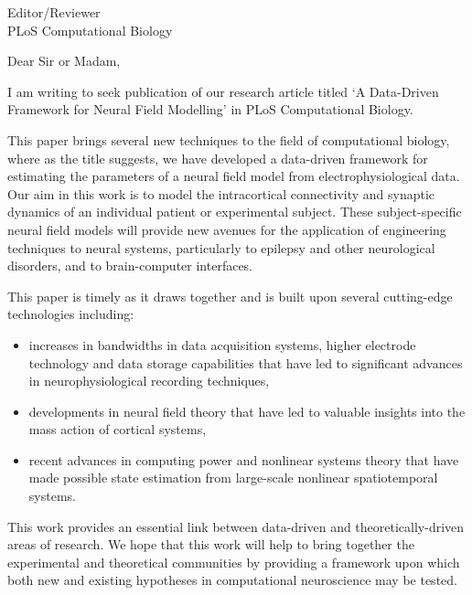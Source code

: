 \documentclass[a4paper,10pt]{letter}
\begin{document}
\vspace{-1cm}
\begin{letter}{Editor/Reviewer \\ PLoS Computational Biology}

\opening{Dear Sir or Madam,}




I am writing to seek publication of our research article titled `A Data-Driven Framework for Neural Field Modelling' in PLoS Computational Biology.

This paper brings several new techniques to the field of computational biology, where as the title suggests, we have developed a data-driven framework for estimating the parameters of a neural field model from electrophysiological data. Our aim in this work is to model the intracortical connectivity and synaptic dynamics of an individual patient or experimental subject. These subject-specific neural field models will provide new avenues for the application of engineering techniques to neural systems, particularly to epilepsy and other neurological disorders, and to brain-computer interfaces.

This paper is timely as it draws together and is built upon several cutting-edge technologies including:
\begin{itemize}
	\item increases in bandwidths in data acquisition systems, higher electrode technology and data storage capabilities that have led to significant advances in neurophysiological recording techniques, 
	\item developments in neural field theory that have led to valuable insights into the mass action of cortical systems,
	\item recent advances in computing power and nonlinear systems theory that have made possible state estimation from large-scale nonlinear spatiotemporal systems.
\end{itemize}

This work provides an essential link between data-driven and theoretically-driven areas of research. We hope that this work will help to bring together the experimental and theoretical communities by providing a framework upon which both new and existing hypotheses in computational neuroscience may be tested.


\end{letter}
\end{document}
